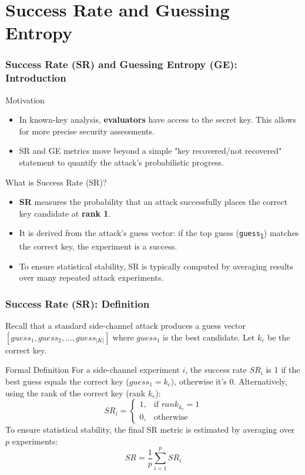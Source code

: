 \section{Success Rate and Guessing Entropy}

\begin{frame}
    \frametitle{Success Rate (SR) and Guessing Entropy (GE): Introduction}
    
    \begin{block}{Motivation}
        \begin{itemize}
            \item In known-key analysis, \textbf{evaluators} have access to the secret key. This allows for more precise security assessments.
            \item SR and GE metrics move beyond a simple "key recovered/not recovered" statement to quantify the attack's probabilistic progress.
        \end{itemize}
    \end{block}
    
    \begin{block}{What is Success Rate (SR)?}
        \begin{itemize}
            \item \textbf{SR} measures the probability that an attack successfully places the correct key candidate at \textbf{rank 1}.
            \item It is derived from the attack's guess vector: if the top guess (\texttt{guess\textsubscript{1}}) matches the correct key, the experiment is a success.
            \item To ensure statistical stability, SR is typically computed by averaging results over many repeated attack experiments.
        \end{itemize}
    \end{block}
\end{frame}

\begin{frame}
    \frametitle{Success Rate (SR): Definition}
    
        Recall that a standard side-channel attack produces a guess vector $[guess_1, guess_2, \dots, guess_{|K|}]$ where $guess_1$ is the best candidate. \newline
        Let $k_c$ be the correct key.    
    \begin{block}{Formal Definition}
        For a side-channel experiment $i$, the success rate $SR_i$ is 1 if the best guess equals the correct key ($guess_1 = k_c$), otherwise it's 0.
        Alternatively, using the rank of the correct key (rank $k_c$):
        $$ SR_i = \begin{cases} 1, & \text{if } rank_{k_c} = 1 \\ 0, & \text{otherwise} \end{cases} $$
        To ensure statistical stability, the final SR metric is estimated by averaging over $p$ experiments:
        $$ SR = \frac{1}{p} \sum_{i=1}^{p} SR_i $$
    \end{block}
\end{frame}


